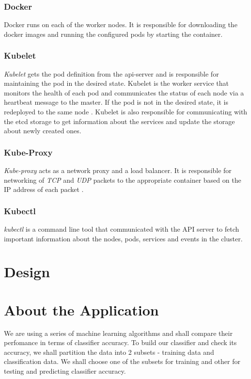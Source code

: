 \documentclass[9pt,twocolumn,twoside]{../../styles/osajnl}
\begin{document}
{\subsubsection{Docker}
Docker runs on each of the worker nodes. It is responsible for
downloading the docker images and running the configured pods by
starting the container.

\subsubsection{Kubelet}
\emph{Kubelet} gets the pod definition from the api-server and is
responsible for maintaining the pod in the desired state. Kubelet is
the worker service that monitors the health of each pod and
communicates the status of each node via a heartbeat message to the
master. If the pod is not in the desired state, it is redeployed to
the same node \cite{www-wiki-kubernetes}. Kubelet is also responsible
for communicating with the etcd storage to get information about the
services and update the storage about newly created ones.

\subsubsection{Kube-Proxy}
\emph{Kube-proxy} acts as a network proxy and a load balancer. It is
responsible for networking of \emph{TCP} and \emph{UDP} packets to the
appropriate container based on the IP address of each packet
\cite{www-wiki-kubernetes} \cite{www-kubernetes-architecture}.

\subsubsection{Kubectl}
\emph{kubectl} is a command line tool that communicated with the API
server to fetch important information about the nodes, pods, services
and events in the cluster.


\section{Design}

\section{About the Application}
We are using a series of machine learning algorithms and shall compare
their perfomance in terms of classifier accuracy. To build our
classifier and check its accuracy, we shall partition the data into 2
subsets - training data and classification data. We shall choose one
of the subsets for training and other for testing and predicting
classifier accuracy.

}
\end{document}
